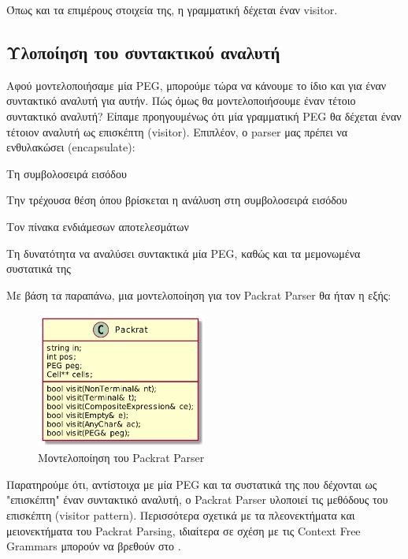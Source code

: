 \documentclass[diploma]{softlab-thesis}
\begin{document}
\vspace{0.5cm}
Όπως και τα επιμέρους στοιχεία της, η γραμματική δέχεται έναν visitor.

\subsection{Υλοποίηση του συντακτικού αναλυτή}

Αφού μοντελοποιήσαμε μία PEG, μπορούμε τώρα να κάνουμε το ίδιο και για έναν συντακτικό αναλυτή για αυτήν. 
Πώς όμως θα μοντελοποιήσουμε έναν τέτοιο συντακτικό αναλυτή?
Είπαμε προηγουμένως ότι μία γραμματική PEG θα δέχεται έναν τέτοιον αναλυτή ως επισκέπτη (visitor).
Επιπλέον, ο parser μας πρέπει να ενθυλακώσει (encapsulate):

\begin{description}[font=$\bullet$\scshape\bfseries]
	\item Τη συμβολοσειρά εισόδου
	\item Την τρέχουσα θέση όπου βρίσκεται η ανάλυση στη συμβολοσειρά εισόδου
	\item Τον πίνακα ενδιάμεσων αποτελεσμάτων
	\item Τη δυνατότητα να αναλύσει συντακτικά μία PEG, καθώς και τα μεμονωμένα συστατικά της
\end{description}

Με βάση τα παραπάνω, μια μοντελοποίηση για τον Packrat Parser θα ήταν η εξής:

\begin{figure}[h]
    \centering
	\includegraphics[width=0.50\textwidth]{uml/packrat}
	\caption{Μοντελοποίηση του Packrat Parser}
    \label{fig:packrat_parser}
\end{figure}

\newpage
Παρατηρούμε ότι, αντίστοιχα με μία PEG και τα συστατικά της που δέχονται ως "επισκέπτη" έναν συντακτικό αναλυτή, ο Packrat Parser υλοποιεί τις μεθόδους του επισκέπτη (visitor pattern).
Περισσότερα σχετικά με τα πλεονεκτήματα και μειονεκτήματα του Packrat Parsing, ιδιαίτερα σε σχέση με τις Context Free Grammars μπορούν να βρεθούν στο \cite{Ford2004}.
\end{document}
